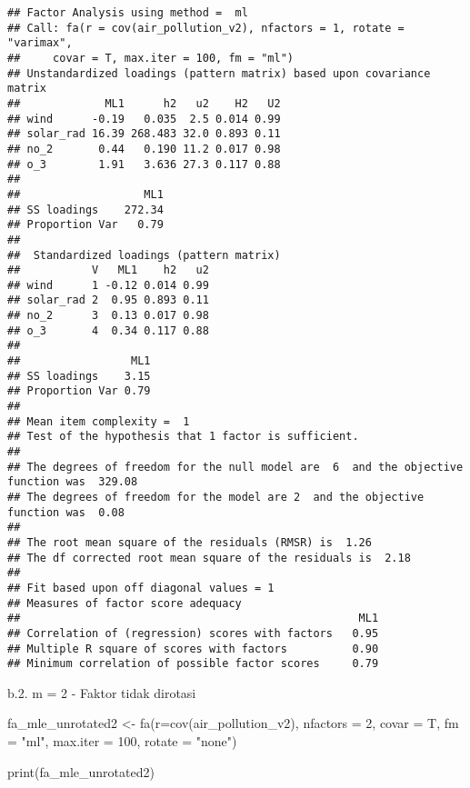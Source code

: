 \documentclass[
]{article}
\newenvironment{Shaded}{\begin{snugshade}}{\end{snugshade}}
\newcommand{\AttributeTok}[1]{\textcolor[rgb]{0.77,0.63,0.00}{#1}}
\newcommand{\DecValTok}[1]{\textcolor[rgb]{0.00,0.00,0.81}{#1}}
\newcommand{\FunctionTok}[1]{\textcolor[rgb]{0.00,0.00,0.00}{#1}}
\newcommand{\NormalTok}[1]{#1}
\newcommand{\OtherTok}[1]{\textcolor[rgb]{0.56,0.35,0.01}{#1}}
\newcommand{\StringTok}[1]{\textcolor[rgb]{0.31,0.60,0.02}{#1}}
\begin{document}
\begin{verbatim}
## Factor Analysis using method =  ml
## Call: fa(r = cov(air_pollution_v2), nfactors = 1, rotate = "varimax", 
##     covar = T, max.iter = 100, fm = "ml")
## Unstandardized loadings (pattern matrix) based upon covariance matrix
##             ML1      h2   u2    H2   U2
## wind      -0.19   0.035  2.5 0.014 0.99
## solar_rad 16.39 268.483 32.0 0.893 0.11
## no_2       0.44   0.190 11.2 0.017 0.98
## o_3        1.91   3.636 27.3 0.117 0.88
## 
##                   ML1
## SS loadings    272.34
## Proportion Var   0.79
## 
##  Standardized loadings (pattern matrix)
##           V   ML1    h2   u2
## wind      1 -0.12 0.014 0.99
## solar_rad 2  0.95 0.893 0.11
## no_2      3  0.13 0.017 0.98
## o_3       4  0.34 0.117 0.88
## 
##                 ML1
## SS loadings    3.15
## Proportion Var 0.79
## 
## Mean item complexity =  1
## Test of the hypothesis that 1 factor is sufficient.
## 
## The degrees of freedom for the null model are  6  and the objective function was  329.08
## The degrees of freedom for the model are 2  and the objective function was  0.08 
## 
## The root mean square of the residuals (RMSR) is  1.26 
## The df corrected root mean square of the residuals is  2.18 
## 
## Fit based upon off diagonal values = 1
## Measures of factor score adequacy             
##                                                    ML1
## Correlation of (regression) scores with factors   0.95
## Multiple R square of scores with factors          0.90
## Minimum correlation of possible factor scores     0.79
\end{verbatim}

b.2. m = 2 - Faktor tidak dirotasi

\begin{Shaded}
\begin{Highlighting}[]
\NormalTok{fa\_mle\_unrotated2 }\OtherTok{\textless{}{-}} \FunctionTok{fa}\NormalTok{(}\AttributeTok{r=}\FunctionTok{cov}\NormalTok{(air\_pollution\_v2), }\AttributeTok{nfactors =} \DecValTok{2}\NormalTok{, }\AttributeTok{covar =}\NormalTok{ T, }\AttributeTok{fm =} \StringTok{"ml"}\NormalTok{, }\AttributeTok{max.iter =} \DecValTok{100}\NormalTok{, }\AttributeTok{rotate =} \StringTok{"none"}\NormalTok{)}

\FunctionTok{print}\NormalTok{(fa\_mle\_unrotated2)}
\end{Highlighting}
\end{Shaded}
\end{document}
